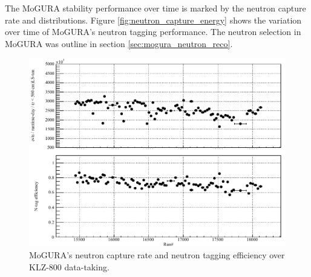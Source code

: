 The MoGURA stability performance over time is marked by the neutron capture rate and distributions. Figure \ref{fig:neutron_capture_energy} shows the variation over time of MoGURA's neutron tagging performance. The neutron selection in MoGURA was outline in section \ref{sec:mogura_neutron_reco}.
\begin{figure}[htb]
	\centering
	\includegraphics[scale=0.35]{neutron_capture_trend.png}
	\caption{MoGURA's neutron capture rate and neutron tagging efficiency over KLZ-800 data-taking.}
	\label{fig:neutron_capture_trend}
\end{figure}
